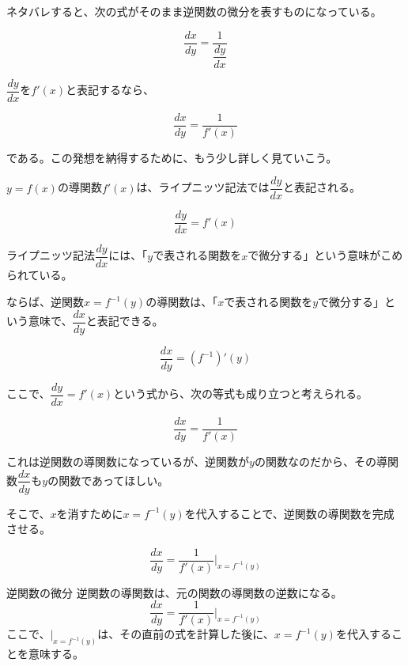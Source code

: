 \documentclass[../math-imaging]{subfiles}
\begin{document}
ネタバレすると、次の式がそのまま逆関数の微分を表すものになっている。

\begin{equation}
  \dfrac{dx}{dy} = \dfrac{1}{\dfrac{dy}{dx}}
\end{equation}

$\dfrac{dy}{dx}$を$f'(x)$と表記するなら、

\begin{equation}
  \dfrac{dx}{dy} = \dfrac{1}{f'(x)}
\end{equation}

である。この発想を納得するために、もう少し詳しく見ていこう。

\froufrou

$y=f(x)$の導関数$f'(x)$は、ライプニッツ記法では$\dfrac{dy}{dx}$と表記される。

\begin{equation}
  \frac{dy}{dx} = f'(x)
\end{equation}

ライプニッツ記法$\dfrac{dy}{dx}$には、「$y$で表される関数を$x$で微分する」という意味がこめられている。

ならば、逆関数$x = f^{-1}(y)$の導関数は、「$x$で表される関数を$y$で微分する」という意味で、$\dfrac{dx}{dy}$と表記できる。

\begin{equation}
  \frac{dx}{dy} = (f^{-1})'(y)
\end{equation}

ここで、$\dfrac{dy}{dx} = f'(x)$という式から、次の等式も成り立つと考えられる。

\begin{equation}
  \frac{dx}{dy} = \frac{1}{f'(x)}
\end{equation}

これは逆関数の導関数になっているが、逆関数が$y$の関数なのだから、その導関数$\dfrac{dx}{dy}$も$y$の関数であってほしい。

そこで、$x$を消すために$x = f^{-1}(y)$を代入することで、逆関数の導関数を完成させる。

\begin{equation}
  \frac{dx}{dy} = \frac{1}{f'(x)} \Bigg|_{x=f^{-1}(y)}
\end{equation}

\begin{theorem}{逆関数の微分}
  \newline
  逆関数の導関数は、元の関数の導関数の逆数になる。
  \LARGE
  \begin{equation}
    \frac{dx}{dy} = \frac{1}{f'(x)} \Bigg|_{x=f^{-1}(y)}
  \end{equation}
  \normalsize
  ここで、$\Bigg|_{x=f^{-1}(y)}$は、その直前の式を計算した後に、$x=f^{-1}(y)$を代入することを意味する。
\end{theorem}
\end{document}
